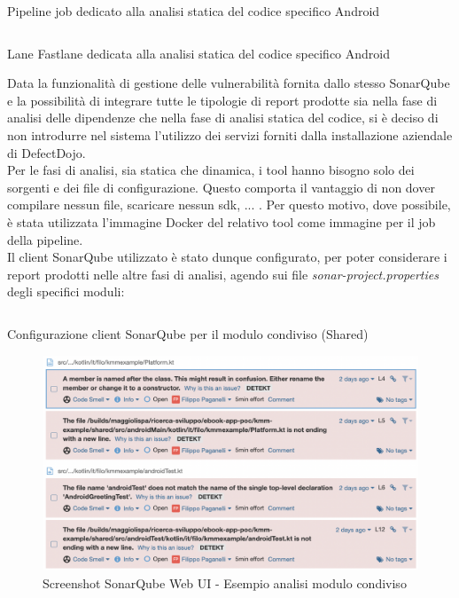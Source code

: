 \begin{listing}[H]
\inputminted{yaml}{code/4-sastjob}
\caption{Pipeline job dedicato alla analisi statica del codice specifico Android}
\end{listing}

\begin{listing}[H]
\inputminted{ruby}{code/4-sastfastlane}
\caption{Lane Fastlane dedicata alla analisi statica del codice specifico Android}
\end{listing}

Data la funzionalità di gestione delle vulnerabilità fornita dallo stesso SonarQube e la possibilità di integrare tutte le tipologie di report prodotte sia nella fase di analisi delle dipendenze che nella fase di analisi statica del codice, si è deciso di non introdurre nel sistema l'utilizzo dei servizi forniti dalla installazione aziendale di DefectDojo.\\
Per le fasi di analisi, sia statica che dinamica, i tool hanno bisogno solo dei sorgenti e dei file di configurazione. Questo comporta il vantaggio di non dover compilare nessun file, scaricare nessun sdk, ... . Per questo motivo, dove possibile, è stata utilizzata l'immagine Docker del relativo tool come immagine per il job della pipeline.\\
Il client SonarQube utilizzato è stato dunque configurato, per poter considerare i report prodotti nelle altre fasi di analisi, agendo sui file \textit{sonar-project.properties} degli specifici moduli:
\begin{listing}[H]
\inputminted{kotlin}{code/4-sonarplugin}
\caption{Configurazione client SonarQube per il modulo condiviso (Shared)}
\end{listing}
\begin{figure}[H]
\centering
\includegraphics[width=1\textwidth]{img/Screenshot 2022-06-19 at 15.33.37.png}
\caption{Screenshot SonarQube Web UI - Esempio analisi modulo condiviso}
\end{figure}
